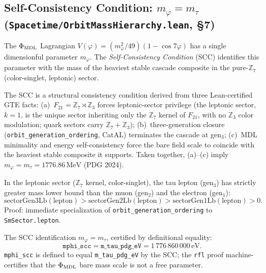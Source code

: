 \documentclass[11pt,a4paper]{article}
\newenvironment{keybox}[1]{%
  \Needspace*{8\baselineskip}%
  \begin{tcolorbox}[
    enhanced,
    breakable=false,
    colback=blue!5,
    colframe=blue!45!black,
    coltitle=black,
    colbacktitle=blue!14,
    boxrule=0.85pt,
    arc=2.5pt,
    left=9pt, right=9pt, top=6pt, bottom=6pt,
    titlerule=0.55pt,
    fonttitle=\bfseries,
    title={#1},
    before upper=\raggedright,
    before skip=0.9\baselineskip,
    after skip=0.9\baselineskip
  ]%
}{%
  \end{tcolorbox}%
}
\theoremstyle{definition}
\begin{document}
\subsection{Self-Consistency Condition: $m_\varphi = m_\tau$
  (\texttt{Spacetime/OrbitMassHierarchy.lean}, \S7)}\label{subsec:scc-mphi-mtau}

The $\Phi_{\rm MDL}$ Lagrangian
$V(\varphi) = (m_\varphi^2/49)(1-\cos 7\varphi)$
has a single dimensionful parameter $m_\varphi$.
The \emph{Self-Consistency Condition} (SCC) identifies this parameter with the
mass of the heaviest stable cascade composite in the pure-$\mathbb{Z}_7$
(color-singlet, leptonic) sector.

The SCC is a structural consistency condition derived from three Lean-certified
GTE facts:
(a)~$F_{21} = \mathbb{Z}_7 \rtimes \mathbb{Z}_3$ forces leptonic-sector privilege
(the leptonic sector, $k=1$, is the unique sector inheriting only the
$\mathbb{Z}_7$ kernel of $F_{21}$, with no $\mathbb{Z}_3$ color modulation;
quark sectors carry $\mathbb{Z}_7 + \mathbb{Z}_3$);
(b)~three-generation closure (\lstinline|orbit_generation_ordering|, CatAL)
terminates the cascade at gen$_3$;
(c)~MDL minimality and energy self-consistency force the bare field scale to
coincide with the heaviest stable composite it supports.
Taken together, (a)--(c) imply $m_\varphi = m_\tau = 1776.86\,\mathrm{MeV}$ (PDG 2024).

\begin{keybox}{\lstinline|leptonic_sector_heaviest_gen3| (zero sorry)}
In the leptonic sector ($\mathbb{Z}_7$ kernel, color-singlet), the tau lepton
(gen$_3$) has strictly greater mass lower bound than the muon (gen$_2$) and
the electron (gen$_1$):
\[
  \mathrm{sectorGen3Lb}(\text{lepton}) > \mathrm{sectorGen2Lb}(\text{lepton})
  > \mathrm{sectorGen1Lb}(\text{lepton}) > 0.
\]
Proof: immediate specialization of \lstinline|orbit_generation_ordering| to
\lstinline|SmSector.lepton|.
\end{keybox}

\begin{keybox}{\lstinline|mphi_equals_tau_mass_scc| (zero sorry)}
The SCC identification $m_\varphi = m_\tau$, certified by definitional equality:
\[
  \texttt{mphi\_scc} = \texttt{m\_tau\_pdg\_eV} = 1\,776\,860\,000\,\text{eV}.
\]
\lstinline|mphi_scc| is defined to equal \lstinline|m_tau_pdg_eV| by the SCC;
the \lstinline|rfl| proof machine-certifies that the $\Phi_{\rm MDL}$ bare mass
scale is not a free parameter.
\end{keybox}
\end{document}
